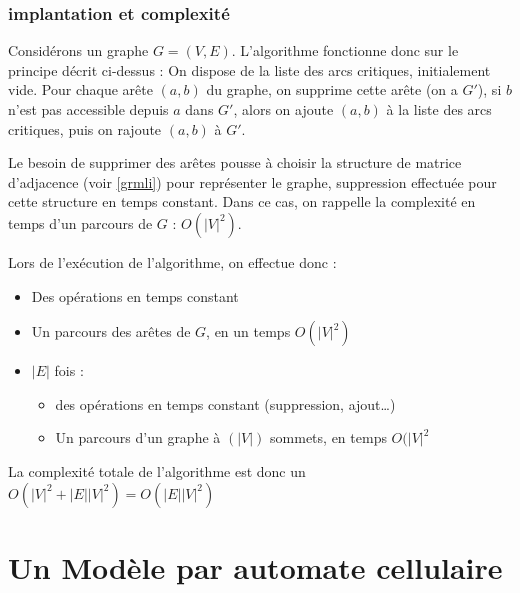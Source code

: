 \documentclass[10pt,draft]{article}
\begin{document}
		\subsubsection{implantation et complexité}
	Considérons un graphe $G=(V,E)$. L'algorithme fonctionne donc sur le principe décrit ci-dessus : On dispose de la liste des arcs critiques, initialement vide. Pour chaque arête $(a,b)$ du graphe, on supprime cette arête (on a $G\prime$), si $b$ n'est pas accessible depuis $a$ dans $G\prime$, alors on ajoute $(a,b)$ à la liste des arcs critiques, puis on rajoute $(a,b)$ à $G\prime$.\par 
Le besoin de supprimer des arêtes pousse à choisir la structure de matrice d'adjacence (voir \ref{grmli}) pour représenter le graphe, suppression effectuée pour cette structure en temps constant. Dans ce cas, on rappelle la complexité en temps d'un parcours de $G$ : $O(|V|^2)$. \par 
Lors de l'exécution de l'algorithme, on effectue donc :
\begin{itemize}
	\item Des opérations en temps constant
	\item Un parcours des arêtes de $G$, en un temps $O(|V|^2)$
	\item $|E|$ fois :
	\begin{itemize}
		\item des opérations en temps constant (suppression, ajout…)
		\item Un parcours d'un graphe à $(|V|)$ sommets, en temps $O(|V|^2$
	\end{itemize}
\end{itemize}

La complexité totale de l'algorithme est donc un $O(|V|^2 + |E||V|^2) = O(|E||V|^2)$

\section{Un Modèle par automate cellulaire}
\end{document}
